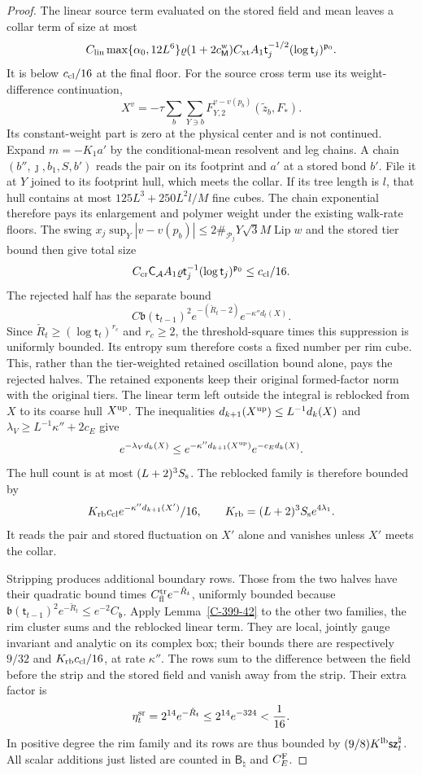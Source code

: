 \documentclass[11pt,letterpaper,reqno]{amsart}
\theoremstyle{definition}
\theoremstyle{remark}
\begin{document}
\begin{proof}
The linear source term evaluated on the stored field
and mean leaves a collar term of size at most
\[
 C_{\rm lin}\max\{\alpha_0,12L^6\}\varrho
 (1+2c_{\mathsf M}^{\rm w})C_{\rm xt}A_1
 \mathsf t_j^{-1/2}(\log\mathsf t_j)^{\mathfrak p_0}.
\]
It is below $c_{\rm cl}/16$ at the final floor. For the
source cross term use its weight-difference continuation,
\[
 X^v=-\tau\sum_b\sum_{Y\ni b}
                  F_{Y,2}^{v-v(p_b)}(\widetilde z_b,F_*).
\]
Its constant-weight part is zero at the physical center
and is not continued. Expand $m=-K_1a'$ by the
conditional-mean resolvent and leg chains. A chain
$(b'',\jmath,b_1,S,b')$ reads the pair on its footprint
and $a'$ at a stored bond $b'$. File it at $Y$ joined
to its footprint hull, which meets the collar.
If its tree length is $l$, that hull contains at most
$125L^3+250L^2l/M$ fine cubes. The chain exponential
therefore pays its enlargement and polymer weight under
the existing walk-rate floors. The swing
$x_j\sup_Y|v-v(p_b)|\le2\#_{\mathcal P_j}Y\sqrt3M\operatorname{Lip}w$
and the stored tier bound then give total size
\[
 C_{\rm cr}\mathsf C_{\mathcal A}A_1\varrho
       \mathsf t_j^{-1}(\log\mathsf t_j)^{\mathfrak p_0}
 \le c_{\rm cl}/16.
\]
The rejected half has the separate bound
\[
 C\mathfrak b(\mathsf t_{t-1})^2
 e^{-(\check R_t-2)}e^{-\kappa''d_t(X)}.
\]
Since $\check R_t\ge(\log\mathsf t_t)^{r_c}$ and
$r_c\ge2$, the threshold-square times this suppression
is uniformly bounded. Its entropy sum therefore costs
a fixed number per rim cube. This, rather than the
tier-weighted retained oscillation bound alone, pays
the rejected halves. The retained exponents keep their
original formed-factor norm with the original tiers.
The linear term left outside the integral is reblocked from
$X$ to its coarse hull $X^{\rm up}$. The inequalities
$d_{k+1}(X^{\rm up})\le L^{-1}d_k(X)$ and
$\lambda_V\ge L^{-1}\kappa''+2c_E$ give
\[
 e^{-\lambda_Vd_k(X)}
 \le e^{-\kappa''d_{k+1}(X^{\rm up})}e^{-c_Ed_k(X)}.
\]
The hull count is at most $(L+2)^3S_{\rm s}$. The reblocked
family is therefore bounded by
\[
 K_{\rm rb}c_{\rm cl}e^{-\kappa''d_{k+1}(X')}/16,
 \qquad K_{\rm rb}=(L+2)^3S_{\rm s}e^{4\lambda_1}.
\]
It reads the pair and stored fluctuation on $X'$ alone and
vanishes unless $X'$ meets the collar.

Stripping produces additional boundary rows. Those from the
two halves have their quadratic bound times
$C_{\rm fl}^{\rm tr}e^{-\check R_t}$, uniformly bounded because
$\mathfrak b(\mathsf t_{t-1})^2e^{-\check R_t}
\le e^{-2}C_{\mathfrak b}$. Apply Lemma~\ref{C-399-42} to the
other two families, the rim cluster sums and the reblocked
linear term. They are local, jointly gauge invariant and
analytic on its complex box; their bounds there are respectively
$9/32$ and $K_{\rm rb}c_{\rm cl}/16$, at rate $\kappa''$.
The rows sum to the difference between the field before the
strip and the stored field and vanish away from the strip.
Their extra factor is
\[
 \eta_t^{\rm sr}=2^{14}e^{-\check R_t}
       \le2^{14}e^{-324}<\frac1{16}.
\]
In positive degree the rim family and its rows are thus bounded
by $(9/8)K^{\rm lb}\mathsf{sz}_t^\natural$.
All scalar additions just listed are counted in
$\mathsf B_\natural$ and $C_E^{\rm F}$.


\end{proof}
\end{document}

